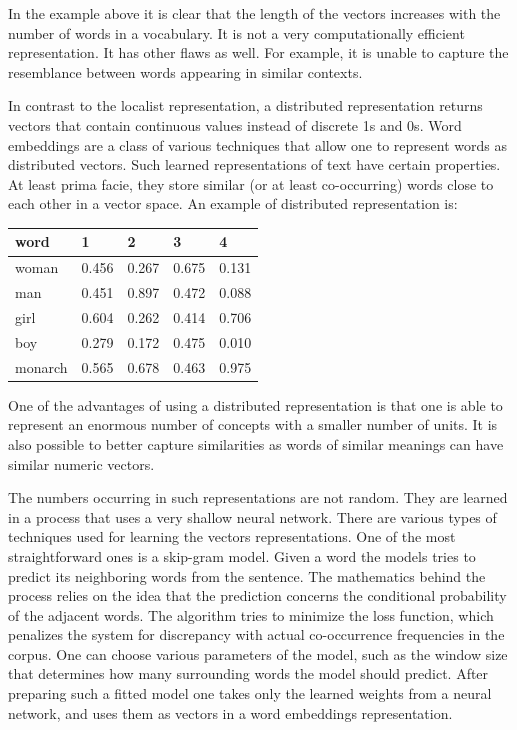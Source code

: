\documentclass[
  12pt,
]{book}
\begin{document}
In the example above it is clear that the length of the vectors increases with the number of words in a vocabulary. It is not a very computationally efficient representation. It has other flaws as well. For example, it is unable to capture the resemblance between words appearing in similar contexts.

In contrast to the localist representation, a distributed representation returns vectors that contain continuous values instead of discrete 1s and 0s. Word embeddings are a class of various techniques that allow one to represent words as distributed vectors. Such learned representations of text have certain properties. At least prima facie, they store similar (or at least co-occurring) words close to each other in a vector space. An example of distributed representation is:

\begin{longtable}[]{@{}lllll@{}}
\toprule
word & 1 & 2 & 3 & 4 \\
\midrule
\endhead
woman & 0.456 & 0.267 & 0.675 & 0.131 \\
man & 0.451 & 0.897 & 0.472 & 0.088 \\
girl & 0.604 & 0.262 & 0.414 & 0.706 \\
boy & 0.279 & 0.172 & 0.475 & 0.010 \\
monarch & 0.565 & 0.678 & 0.463 & 0.975 \\
\bottomrule
\end{longtable}

One of the advantages of using a distributed representation is that one is able to represent an enormous number of concepts with a smaller number of units. It is also possible to better capture similarities as words of similar meanings can have similar numeric vectors.

The numbers occurring in such representations are not random. They are learned in a process that uses a very shallow neural network. There are various types of techniques used for learning the vectors representations. One of the most straightforward ones is a skip-gram model.
Given a word the models tries to predict its neighboring words from the sentence. The mathematics behind the process relies on the idea that the prediction concerns the conditional probability of the adjacent words. The algorithm tries to minimize the loss function, which penalizes the system for discrepancy with actual co-occurrence frequencies in the corpus. One can choose various parameters of the model, such as the window size that determines how many surrounding words the model should predict. After preparing such a fitted model one takes only the learned weights from a neural network, and uses them as vectors in a word embeddings representation.
\end{document}
